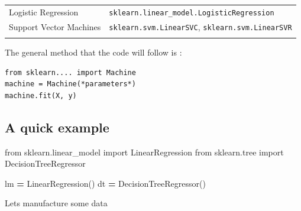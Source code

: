 \documentclass[
  letterpaper,
]{scrbook}
\newenvironment{Shaded}{\begin{snugshade}}{\end{snugshade}}
\newcommand{\ImportTok}[1]{#1}
\newcommand{\NormalTok}[1]{#1}
\newcommand{\OperatorTok}[1]{\textcolor[rgb]{0.81,0.36,0.00}{\textbf{#1}}}
\begin{document}
\begin{longtable}[]{@{}ll@{}}
\begin{minipage}[t]{0.26\columnwidth}
Logistic Regression\strut
\end{minipage} & \begin{minipage}[t]{0.68\columnwidth}\raggedright
\texttt{sklearn.linear\_model.LogisticRegression}\strut
\end{minipage}\tabularnewline
\begin{minipage}[t]{0.26\columnwidth}\raggedright
Support Vector Machines\strut
\end{minipage} & \begin{minipage}[t]{0.68\columnwidth}\raggedright
\texttt{sklearn.svm.LinearSVC}, \texttt{sklearn.svm.LinearSVR}\strut
\end{minipage}\tabularnewline
\begin{minipage}[t]{0.26\columnwidth}\raggedright
\strut
\end{minipage} & \begin{minipage}[t]{0.68\columnwidth}\raggedright
\strut
\end{minipage}\tabularnewline
\bottomrule
\end{longtable}

The general method that the code will follow is :

\begin{verbatim}
from sklearn.... import Machine
machine = Machine(*parameters*)
machine.fit(X, y)
\end{verbatim}

\hypertarget{a-quick-example}{%
\subsection{A quick example}\label{a-quick-example}}

\begin{Shaded}
\begin{Highlighting}[]
\ImportTok{from}\NormalTok{ sklearn.linear\_model }\ImportTok{import}\NormalTok{ LinearRegression}
\ImportTok{from}\NormalTok{ sklearn.tree }\ImportTok{import}\NormalTok{ DecisionTreeRegressor}

\NormalTok{lm }\OperatorTok{=}\NormalTok{ LinearRegression()}
\NormalTok{dt }\OperatorTok{=}\NormalTok{ DecisionTreeRegressor()}
\end{Highlighting}
\end{Shaded}

Lets manufacture some data
\end{document}

